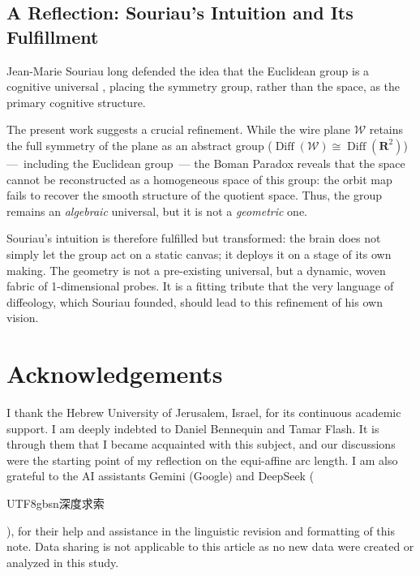 \documentclass[10pt,letterpaper,reqno]{amsart}
\newcommand{\RR}{\mathbf{R}}
\newcommand{\cW}{\mathcal{W}}
\DeclareMathOperator{\Diff}{Diff}
\begin{document}
    \subsection*{A Reflection: Souriau's Intuition and Its Fulfillment}
    
    Jean-Marie Souriau long defended the idea that the Euclidean group is a cognitive universal \cite{Sou84},
    placing the symmetry group,
    rather than the space,
    as the primary cognitive structure.
    
    The present work suggests a crucial refinement.
    While the wire plane $\cW$ retains the full symmetry of the plane as an abstract group ($\Diff(\cW) \cong \Diff(\RR^2)$)
    ---~including the Euclidean group~---
    the Boman Paradox reveals that the space cannot be reconstructed as a homogeneous space of this group:
    the orbit map fails to recover the smooth structure of the quotient space.
    Thus,
    the group remains an \emph{algebraic} universal,
    but it is not a \emph{geometric} one.
    
    Souriau's intuition is therefore fulfilled but transformed:
    the brain does not simply let the group act on a static canvas;
    it deploys it on a stage of its own making.
    The geometry is not a pre-existing universal,
    but a dynamic, woven fabric of 1-dimensional probes.
    It is a fitting tribute that the very language of diffeology,
    which Souriau founded,
    should lead to this refinement of his own vision.

  
  \section*{Acknowledgements}
  I thank the Hebrew University of Jerusalem, Israel, for its continuous academic support.
  I am deeply indebted to Daniel Bennequin and Tamar Flash.
  It is through them that I became acquainted with this subject, and our discussions were the starting point of my reflection on the equi-affine arc length.
  I am also grateful to the AI assistants Gemini (Google) and DeepSeek (\begin{CJK}{UTF8}{gbsn}深度求索\end{CJK}),
  for their help and assistance in the linguistic revision and formatting of this note.
  Data sharing is not applicable to this article as no new data were created or analyzed in this study.
  
\end{document}
